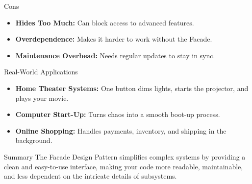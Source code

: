 \documentclass{beamer}
\begin{document}
\begin{frame}{Cons}
    \begin{itemize}
        \item \textbf{Hides Too Much:} Can block access to advanced features.
        \item \textbf{Overdependence:} Makes it harder to work without the Facade.
        \item \textbf{Maintenance Overhead:} Needs regular updates to stay in sync.
    \end{itemize}
\end{frame}




\begin{frame}{Real-World Applications}
    \begin{itemize}
        \item \textbf{Home Theater Systems:} One button dims lights, starts the projector, and plays your movie.
        \item \textbf{Computer Start-Up:} Turns chaos into a smooth boot-up process.
        \item \textbf{Online Shopping:} Handles payments, inventory, and shipping in the background.
    \end{itemize}
\end{frame}

\begin{frame}{Summary}
    \centering
    The Facade Design Pattern simplifies complex systems by providing a clean and easy-to-use interface, making your code more readable, maintainable, and less dependent on the intricate details of subsystems.
\end{frame}
\end{document}
